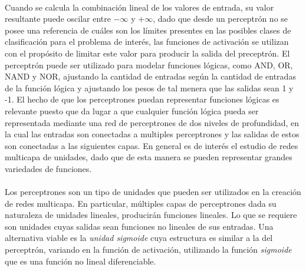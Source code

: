 \paragraph{}Cuando se calcula la combinación lineal de los valores de entrada, su valor resultante puede oscilar entre $-\infty$ y $+\infty$, dado que desde un perceptrón no se posee una referencia de cuáles son los límites presentes en las posibles clases de clasificación para el problema de interés, las funciones de activación se utilizan con el propósito de limitar este valor para producir la salida del preceptrón. El perceptrón puede ser utilizado para modelar funciones lógicas, como AND, OR, NAND y NOR, ajustando la cantidad de entradas según la cantidad de entradas de la función lógica y ajustando los pesos de tal menera que las salidas sean 1 y -1. El hecho de que los perceptrones puedan representar funciones lógicas es relevante puesto que da lugar a que cualquier función lógica pueda ser representada mediante una red de perceptrones de dos niveles de profundidad, en la cual las entradas son conectadas a multiples perceptrones y las salidas de estos son conectadas a las siguientes capas. En general es de interés el estudio de redes multicapa de unidades, dado que de esta manera se pueden representar grandes variedades de funciones.

\paragraph{}Los perceptrones son un tipo de unidades que pueden ser utilizados en la creación de redes multicapa. En particular, múltiples capas de perceptrones dada su naturaleza de unidades lineales, producirán funciones lineales. Lo que se requiere son unidades cuyas salidas sean funciones no lineales de sus entradas. Una alternativa viable es la \textit{unidad sigmoide} cuya estructura es similar a la del perceptrón, variando en la función de activación, utilizando la función \textit{sigmoide} que es una función no lineal diferenciable. 

